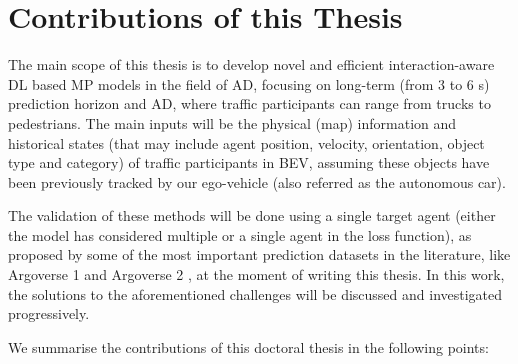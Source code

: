\section{Contributions of this Thesis}
\label{sec:1_objectives_and_contributions}

The main scope of this thesis is to develop novel and efficient interaction-aware \ac{DL} based \ac{MP} models in the field of \ac{AD}, focusing on long-term (from 3 to 6 s) prediction horizon and \ac{AD}, where traffic participants can range from trucks to pedestrians. The main inputs will be the physical (map) information and historical states (that may include agent position, velocity, orientation, object type and category) of traffic participants in \ac{BEV}, assuming these objects have been previously tracked by our ego-vehicle (also referred as the autonomous car). 

The validation of these methods will be done using a single target agent (either the model has considered multiple or a single agent in the loss function), as proposed by some of the most important prediction datasets in the literature, like Argoverse 1 \cite{chang2019argoverse} and Argoverse 2 \cite{wilson2023argoverse}, at the moment of writing this thesis. In this work, the solutions to the aforementioned challenges will be discussed and investigated progressively. 

We summarise the contributions of this doctoral thesis in the following points:

